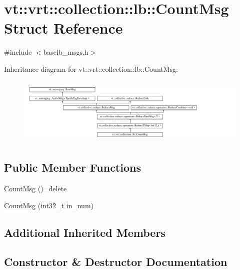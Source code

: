 \hypertarget{structvt_1_1vrt_1_1collection_1_1lb_1_1_count_msg}{}\section{vt\+:\+:vrt\+:\+:collection\+:\+:lb\+:\+:Count\+Msg Struct Reference}
\label{structvt_1_1vrt_1_1collection_1_1lb_1_1_count_msg}


{\ttfamily \#include $<$baselb\+\_\+msgs.\+h$>$}

Inheritance diagram for vt\+:\+:vrt\+:\+:collection\+:\+:lb\+:\+:Count\+Msg\+:\begin{figure}[H]
\begin{center}
\leavevmode
\includegraphics[height=3.274854cm]{structvt_1_1vrt_1_1collection_1_1lb_1_1_count_msg}
\end{center}
\end{figure}
\subsection*{Public Member Functions}
\begin{DoxyCompactItemize}
\item 
\hyperlink{structvt_1_1vrt_1_1collection_1_1lb_1_1_count_msg_a5a5be6041502d30b0e4edb5681651bee}{Count\+Msg} ()=delete
\item 
\hyperlink{structvt_1_1vrt_1_1collection_1_1lb_1_1_count_msg_ab5f72606b12d09ef4d900c6f79c59ddf}{Count\+Msg} (int32\+\_\+t in\+\_\+num)
\end{DoxyCompactItemize}
\subsection*{Additional Inherited Members}


\subsection{Constructor \& Destructor Documentation}
\mbox{\label{structvt_1_1vrt_1_1collection_1_1lb_1_1_count_msg_a5a5be6041502d30b0e4edb5681651bee}} 
